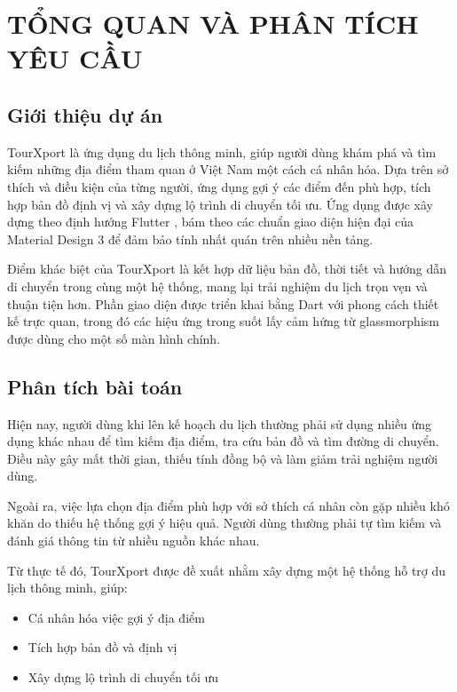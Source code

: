 \chapter{TỔNG QUAN VÀ PHÂN TÍCH YÊU CẦU}

\section{Giới thiệu dự án}

\quad TourXport là ứng dụng du lịch thông minh, giúp người dùng khám phá và tìm kiếm những địa điểm tham quan ở Việt Nam một cách cá nhân hóa. Dựa trên sở thích và điều kiện của từng người, ứng dụng gợi ý các điểm đến phù hợp, tích hợp bản đồ định vị và xây dựng lộ trình di chuyển tối ưu. Ứng dụng được xây dựng theo định hướng Flutter \cite{flutter_doc}, bám theo các chuẩn giao diện hiện đại của Material Design 3 \cite{material3} để đảm bảo tính nhất quán trên nhiều nền tảng.

\quad Điểm khác biệt của TourXport là kết hợp dữ liệu bản đồ, thời tiết và hướng dẫn di chuyển trong cùng một hệ thống, mang lại trải nghiệm du lịch trọn vẹn và thuận tiện hơn. Phần giao diện được triển khai bằng Dart \cite{dart_guide} với phong cách thiết kế trực quan, trong đó các hiệu ứng trong suốt lấy cảm hứng từ glassmorphism \cite{glassmorphism} được dùng cho một số màn hình chính.

\section{Phân tích bài toán}

\quad Hiện nay, người dùng khi lên kế hoạch du lịch thường phải sử dụng nhiều ứng dụng khác nhau để tìm kiếm địa điểm, tra cứu bản đồ và tìm đường di chuyển. Điều này gây mất thời gian, thiếu tính đồng bộ và làm giảm trải nghiệm người dùng.

\quad Ngoài ra, việc lựa chọn địa điểm phù hợp với sở thích cá nhân còn gặp nhiều khó khăn do thiếu hệ thống gợi ý hiệu quả. Người dùng thường phải tự tìm kiếm và đánh giá thông tin từ nhiều nguồn khác nhau.

\quad Từ thực tế đó, TourXport được đề xuất nhằm xây dựng một hệ thống hỗ trợ du lịch thông minh, giúp:
\begin{itemize}
    \item Cá nhân hóa việc gợi ý địa điểm
    \item Tích hợp bản đồ và định vị
    \item Xây dựng lộ trình di chuyển tối ưu
\end{itemize}


